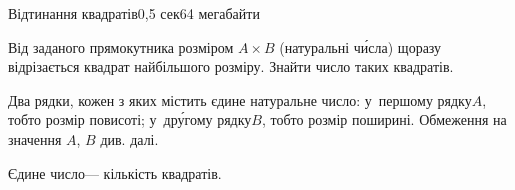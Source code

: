 \begin{problem}{Відтинання квадратів}{\stdinOrInputTxt}{\stdoutOrOutputTxt}{0,5 сек}{64 мегабайти}

Від заданого прямокутника розміром $A\times{}B$ (натуральні ч\'{и}сла) щоразу відрізається квадрат найбільшого розміру. Знайти число таких квадратів.

\InputFile
Два рядки, кожен з яких містить єдине натуральне число: 
у~першому рядку\nolinebreak[3] $A$, тобто розмір по\nolinebreak[3] висоті; 
у~др\'{у}гому рядку\nolinebreak[3] $B$, тобто розмір по\nolinebreak[3] ширині.
Обмеження на значення $A$, $B$ див. далі.

\OutputFile
Єдине число\nolinebreak[3] --- кількість квадратів.

\setlength{\mytemplen}{\parindent}

{

\def\exmpI{\protect\exmp{12\\
8}{3}}
\def\exmpII{\protect\exmp{2018\\
2018}{1}}
\def\exmpIII{\protect\exmp{17\\
42}{12}}

\def\squaresCutsNotePhrase{У~першому тесті маємо ситуацію з рисунку: 
спочатку відрізають квадрат ${8{\times}8}$ і лишається ${4{\times}8}$,
потім відрізають квадрат ${4{\times}4}$ і лишається ${4{\times}4}$, що і є останнім третім квадратом.
\ifAfour\else\par\fi
У~др\'{у}гому тесті відразу маємо квадрат, відрізати взагалі не доводиться, але один квадрат (початковий) все-таки~є.}
\def\squaresCutsPicture{\begin{mfpic}[4]{0}{8}{0}{12}
\xyswap
\lines{(1,0),(1,8)}
\lines{(2,0),(2,8)}
\lines{(3,0),(3,8)}
\lines{(4,0),(4,8)}
\lines{(5,0),(5,8)}
\lines{(6,0),(6,8)}
\lines{(7,0),(7,8)}
\lines{(9,0),(9,8)}
\lines{(10,0),(10,8)}
\lines{(11,0),(11,8)}
%
\lines{(0,1),(12,1)}
\lines{(0,2),(12,2)}
\lines{(0,3),(12,3)}
\lines{(0,4),(12,4)}
\lines{(0,5),(12,5)}
\lines{(0,6),(12,6)}
\lines{(0,7),(12,7)}
%
\pen{2pt}
\lines{(0,0),(0,8)}
\lines{(8,0),(8,8)}
\lines{(12,0),(12,8)}
\lines{(8,4),(12,4)}
\lines{(0,0),(12,0)}
\lines{(0,8),(12,8)}
\end{mfpic}}

}
\end{problem}
